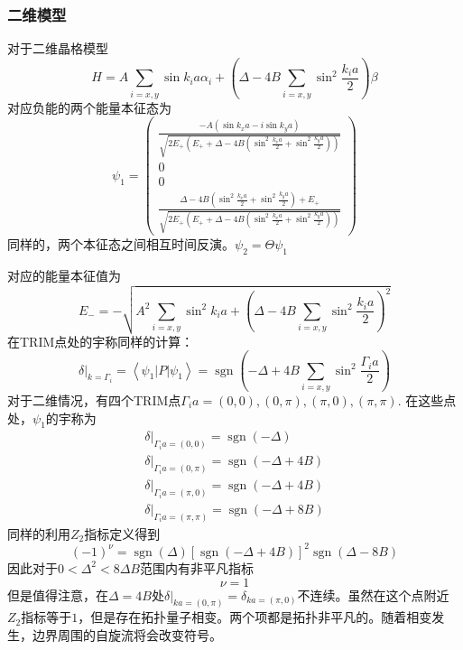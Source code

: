 \documentclass{article}
\numberwithin{equation}{subsection}
\begin{document}
\subsubsection{二维模型}
对于二维晶格模型
\begin{equation}
    H=A \sum_{i=x, y} \sin k_{i} a \alpha_{i}+\left(\Delta-4 B \sum_{i=x, y} \sin ^{2} \frac{k_{i} a}{2}\right) \beta
\end{equation}
对应负能的两个能量本征态为
\begin{equation}
    \psi_1=\begin{pmatrix}
        \frac{-A\left(\sin k_{x} a-i \sin k_{y} a\right)}{\sqrt{2 E_{+}\left(E_{+}+\Delta-4 B\left(\sin ^{2} \frac{k_{x} a}{2}+\sin ^{2} \frac{k_{y} a}{2}\right)\right)}}\\
        0\\
        0\\
        \frac{\Delta-4 B\left(\sin ^{2} \frac{k_{x} a}{2}+\sin ^{2} \frac{k_{y} a}{2}\right)+E_{+}}{\sqrt{2 E_{+}\left(E_{+}+\Delta-4 B\left(\sin ^{2} \frac{k_{x} a}{2}+\sin ^{2} \frac{k_{y} a}{2}\right)\right)}}
    \end{pmatrix}
\end{equation}
同样的，两个本征态之间相互时间反演。$\psi_2=\Theta\psi_1$

对应的能量本征值为
\begin{equation}
    E_{-}=-\sqrt{A^{2} \sum_{i=x, y} \sin ^{2} k_{i} a+\left(\Delta-4 B \sum_{i=x, y} \sin ^{2} \frac{k_{i} a}{2}\right)^{2}}
\end{equation}
在TRIM点处的宇称同样的计算：
\begin{equation}
    \left.\delta\right|_{k=\Gamma_{i}}=\left\langle\psi_{1}|P| \psi_{1}\right\rangle=\operatorname{sgn}\left(-\Delta+4 B \sum_{i=x, y} \sin ^{2} \frac{\Gamma_{i} a}{2}\right)
\end{equation}
对于二维情况，有四个TRIM点$\Gamma_ia=(0,0),(0,\pi),(\pi,0),(\pi,\pi)$. 在这些点处，$\psi_1$的宇称为
\begin{equation}
    \begin{array}{l}
        \left.\delta\right|_{\Gamma_{i} a=(0,0)}=\operatorname{sgn}(-\Delta) \\
        \left.\delta\right|_{\Gamma_{i} a=(0, \pi)}=\operatorname{sgn}(-\Delta+4 B) \\
        \left.\delta\right|_{\Gamma_{i} a=(\pi, 0)}=\operatorname{sgn}(-\Delta+4 B) \\
        \left.\delta\right|_{\Gamma_{i} a=(\pi, \pi)}=\operatorname{sgn}(-\Delta+8 B)
        \end{array}
\end{equation}
同样的利用$Z_2$指标定义得到
\begin{equation}
    (-1)^{\nu}=\operatorname{sgn}(\Delta)[\operatorname{sgn}(-\Delta+4 B)]^{2} \operatorname{sgn}(\Delta-8 B)
\end{equation}
因此对于$0<\Delta^2<8\Delta B$范围内有非平凡指标
\begin{equation}
    \nu=1
\end{equation}
但是值得注意，在$\Delta=4B$处$\delta|_{ka=(0,\pi)}=\delta_{ka=(\pi,0)}$不连续。虽然在这个点附近$Z_2$指标等于$1$，但是存在拓扑量子相变。两个项都是拓扑非平凡的。随着相变发生，边界周围的自旋流将会改变符号。
\end{document}
